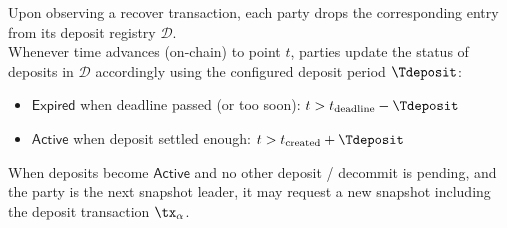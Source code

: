 \quad Upon observing a recover transaction,
each party drops the corresponding entry from its deposit registry
$\mathcal{D}$. \\

\quad Whenever time advances (on-chain) to point
$t$, parties update the status of deposits in $\mathcal{D}$ accordingly using
the configured deposit period $\Tdeposit$:
\begin{itemize}
	\item $\mathsf{Expired}$ when deadline passed (or too soon): $t > t_{\text{deadline}} - \Tdeposit$
	\item $\mathsf{Active}$ when deposit settled enough: $t > t_{\text{created}} + \Tdeposit$
\end{itemize}
When deposits become $\mathsf{Active}$ and no other deposit / decommit is
pending, and the party is the next snapshot leader, it may request a new
snapshot including the deposit transaction $\tx_{\alpha}$. \\

